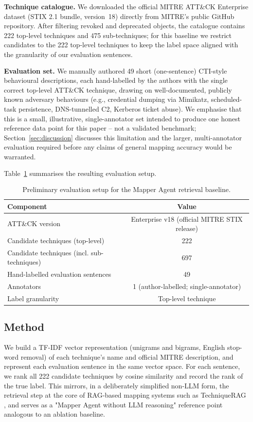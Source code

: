 \documentclass[runningheads]{llncs}
\begin{document}
\textbf{Technique catalogue.} We downloaded the official MITRE ATT\&CK Enterprise dataset (STIX 2.1 bundle, version~18) directly from MITRE's public GitHub repository. After filtering revoked and deprecated objects, the catalogue contains 222 top-level techniques and 475 sub-techniques; for this baseline we restrict candidates to the 222 top-level techniques to keep the label space aligned with the granularity of our evaluation sentences.

\textbf{Evaluation set.} We manually authored 49 short (one-sentence) CTI-style behavioural descriptions, each hand-labelled by the authors with the single correct top-level ATT\&CK technique, drawing on well-documented, publicly known adversary behaviours (e.g., credential dumping via Mimikatz, scheduled-task persistence, DNS-tunnelled C2, Kerberos ticket abuse). We emphasise that this is a small, illustrative, single-annotator set intended to produce one honest reference data point for this paper -- not a validated benchmark; Section~\ref{sec:discussion} discusses this limitation and the larger, multi-annotator evaluation required before any claims of general mapping accuracy would be warranted.

Table~\ref{tab:dataset} summarises the resulting evaluation setup.

\begin{table}[t]
\centering
\caption{Preliminary evaluation setup for the Mapper Agent retrieval baseline.}
\label{tab:dataset}
\begin{tabular}{@{}lc@{}}
\toprule
\textbf{Component} & \textbf{Value} \\
\midrule
ATT\&CK version & Enterprise v18 (official MITRE STIX release) \\
Candidate techniques (top-level) & 222 \\
Candidate techniques (incl. sub-techniques) & 697 \\
Hand-labelled evaluation sentences & 49 \\
Annotators & 1 (author-labelled; single-annotator) \\
Label granularity & Top-level technique \\
\bottomrule
\end{tabular}
\end{table}

\subsection{Method}

We build a TF-IDF vector representation (unigrams and bigrams, English stop-word removal) of each technique's name and official MITRE description, and represent each evaluation sentence in the same vector space. For each sentence, we rank all 222 candidate techniques by cosine similarity and record the rank of the true label. This mirrors, in a deliberately simplified non-LLM form, the retrieval step at the core of RAG-based mapping systems such as TechniqueRAG \cite{hierrag2026}, and serves as a "Mapper Agent without LLM reasoning" reference point analogous to an ablation baseline.
\end{document}
